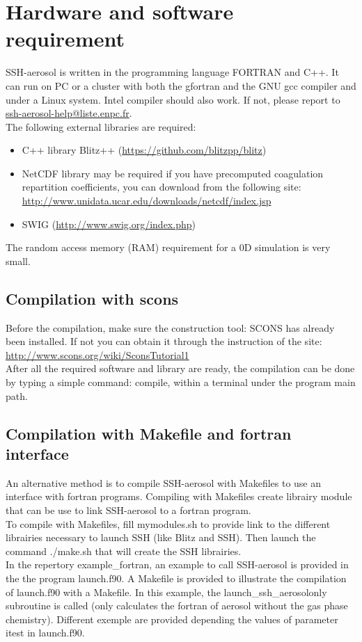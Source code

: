 \documentclass[a4paper,11pt]{article}
\begin{document}
\section*{Hardware and software requirement}
SSH-aerosol is written in the programming language FORTRAN and C++. It can run on PC or a cluster with both the gfortran and the GNU gcc compiler and under a Linux system. Intel compiler should also work. If not, please report to  \url{ssh-aerosol-help@liste.enpc.fr}.\\

The following external libraries are required:
\begin{itemize}
\item C++ library Blitz++ (\url{https://github.com/blitzpp/blitz})
\item NetCDF library may be required if you have precomputed coagulation repartition coefficients, you can download from the following site:
\url{http://www.unidata.ucar.edu/downloads/netcdf/index.jsp}
\item SWIG (\url{http://www.swig.org/index.php})
\end{itemize}
The random access memory (RAM) requirement for a 0D simulation is very small. 

\subsection{Compilation with scons}

Before the compilation, make sure the construction tool: SCONS has already been installed. 
If not you can obtain it through the instruction of the site: \url{http://www.scons.org/wiki/SconsTutorial1}\\

After all the required software and library are ready, the compilation can be done by typing a simple command: compile, within a terminal under the program main path.

\subsection{Compilation with Makefile and fortran interface}

An alternative method is to compile SSH-aerosol with Makefiles to use an interface with fortran programs. Compiling with Makefiles create librairy module that can be use to link SSH-aerosol to a fortran program.\\
To compile with Makefiles, fill mymodules.sh to provide link to the different librairies necessary to launch SSH (like Blitz and SSH). Then launch the command ./make.sh that will create the SSH librairies.\\
In the repertory example\_fortran, an example to call SSH-aerosol is provided in the the program launch.f90. A Makefile is provided to illustrate the compilation of launch.f90 with a Makefile. In this example, the launch\_ssh\_aerosolonly subroutine is called (only calculates the fortran of aerosol without the gas phase chemistry). Different exemple are provided depending the values of parameter itest in launch.f90.
\end{document}
